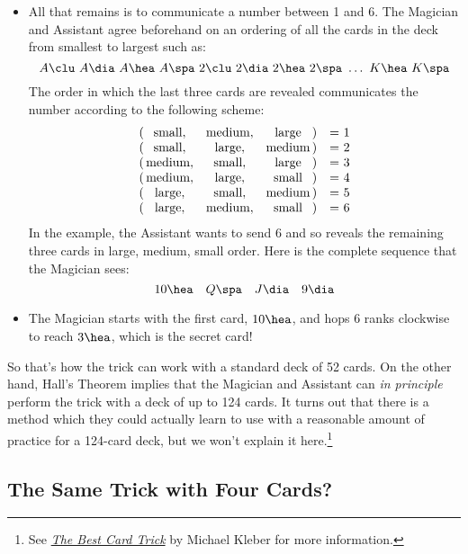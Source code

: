 \begin{itemize}
\item All that remains is to communicate a number between 1 and 6.
The Magician and Assistant agree beforehand on an ordering of all the
cards in the deck from smallest to largest such as:
%
\[
A \clu\  A \dia\  A \hea\ A \spa\
2 \clu\  2 \dia\  2 \hea\ 2 \spa\
\dots\ K \hea\ K \spa
\]
%
The order in which the last three cards are revealed communicates the
number according to the following scheme:
%
\[
\begin{array}{r@{\,}ccc@{\,}ll}
(&\text{small},&\text{medium},&\text{large}&) & ${}= 1$ \\
(&\text{small},&\text{large},&\text{medium}&) & ${}= 2$ \\
(&\text{medium},&\text{small},&\text{large}&) & ${}= 3$ \\
(&\text{medium},&\text{large},&\text{small}&) & ${}= 4$ \\
(&\text{large},&\text{small},&\text{medium}&) & ${}= 5$ \\
(&\text{large},&\text{medium},&\text{small}&) & ${}= 6$
\end{array}
\]
%
In the example, the Assistant wants to send 6 and so reveals the
remaining three cards in large, medium, small order.  Here is the
complete sequence that the Magician sees:
%
\[
10 \hea \quad Q \spa \quad J \dia \quad 9 \dia
\]

\item The Magician starts with the first card, $10 \hea$, and hops 6
ranks clockwise to reach $3 \hea$, which is the secret card!

\end{itemize}

So that's how the trick can work with a standard deck of 52 cards.  On
the other hand, Hall's Theorem implies that the Magician and Assistant
can \emph{in principle} perform the trick with a deck of up to 124
cards.  It turns out that there is a method which they could actually
learn to use with a reasonable amount of practice for a 124-card deck,
but we won't explain it here.\footnote{See
  \href{http://courses.csail.mit.edu/6.042/spring11/Kleber-cardTrick.pdf}{\emph{The
      Best Card Trick}} by Michael Kleber for more information.}

\iffalse
Also, \emph{Using a Card Trick to Teach Discrete Mathematics}, Simonson,
Shai, Holm, Tara S., Primus: Problems, Resources, and Issues in
Mathematics Undergraduate Studies, Sep 2003.
\fi

\subsection{The Same Trick with Four Cards?}\label{4_card_trick_subsec}


